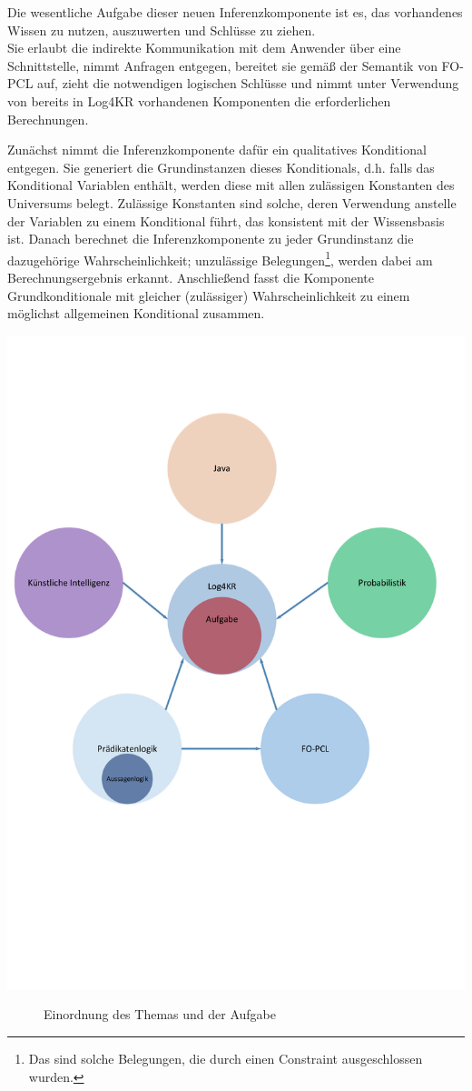 \documentclass[a4paper, 11pt]{book}
\begin{document}
Die wesentliche Aufgabe dieser neuen Inferenzkomponente ist es, das vorhandenes Wissen zu nutzen, auszuwerten und Schlüsse zu ziehen.\\
Sie erlaubt die indirekte Kommunikation mit dem Anwender über eine Schnittstelle, nimmt Anfragen entgegen, bereitet sie gemäß der Semantik von FO-PCL auf, zieht die notwendigen logischen Schlüsse und nimmt unter Verwendung von bereits in Log4KR vorhandenen Komponenten die erforderlichen Berechnungen.
 
Zunächst nimmt die Inferenzkomponente dafür ein qualitatives Konditional entgegen. Sie generiert die Grundinstanzen dieses Konditionals, d.h. falls das Konditional Variablen enthält, werden diese mit allen zulässigen Konstanten des Universums belegt. Zulässige Konstanten sind solche, deren Verwendung anstelle der Variablen zu einem Konditional führt, das konsistent mit der Wissensbasis ist. Danach berechnet die Inferenzkomponente zu jeder Grundinstanz die dazugehörige Wahrscheinlichkeit; unzulässige Belegungen\footnote{Das sind solche Belegungen, die durch einen Constraint ausgeschlossen wurden.}, werden dabei am Berechnungsergebnis erkannt. Anschließend fasst die Komponente Grundkonditionale mit gleicher (zulässiger) Wahrscheinlichkeit zu einem möglichst allgemeinen Konditional zusammen.

\includegraphics[scale = 0.3]{Graphics/Eingangsbild}
\begin{figure}[h]
	\caption{Einordnung des Themas und der Aufgabe}
	\label{Eingangsgrafik}
\end{figure}
\newpage
\end{document}
